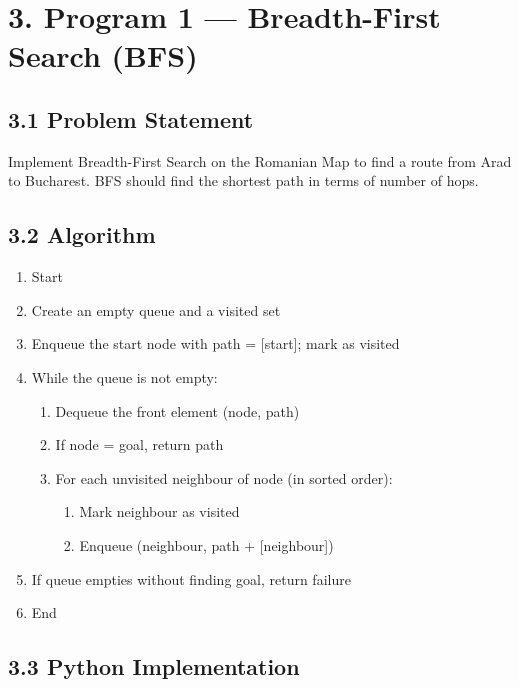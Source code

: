 \documentclass[12pt,a4paper]{article}
\begin{document}
\section*{3. Program 1 --- Breadth-First Search (BFS)}

\subsection*{3.1 Problem Statement}

Implement Breadth-First Search on the Romanian Map to find a route from Arad to Bucharest. BFS should find the shortest path in terms of number of hops.

\subsection*{3.2 Algorithm}

\begin{enumerate}[leftmargin=1.6em]
  \item Start
  \item Create an empty queue and a visited set
  \item Enqueue the start node with path = [start]; mark as visited
  \item While the queue is not empty:
  \begin{enumerate}[leftmargin=1.6em,label=(\alph*)]
    \item Dequeue the front element (node, path)
    \item If node = goal, return path
    \item For each unvisited neighbour of node (in sorted order):
    \begin{enumerate}[leftmargin=1.6em,label=\roman*.]
      \item Mark neighbour as visited
      \item Enqueue (neighbour, path + [neighbour])
    \end{enumerate}
  \end{enumerate}
  \item If queue empties without finding goal, return failure
  \item End
\end{enumerate}

\subsection*{3.3 Python Implementation}
\end{document}
